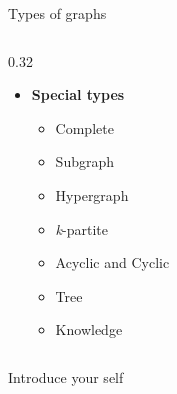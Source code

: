 \documentclass{beamer}
\begin{document}
\begin{frame}{Types of graphs}
\begin{columns}[t]
            \begin{column}{0.32\textwidth}
               \begin{itemize}
                    \item \textbf{Special types}
                    \begin{itemize}
                        \item Complete
                        \item Subgraph
                        \item Hypergraph
                        \item \textit{k}-partite
                        \item Acyclic and Cyclic
                        \item Tree
                        \item Knowledge            
                    \end{itemize}
                \end{itemize}
            \end{column}
        \end{columns}

        \begin{note}
            {Introduce your self}
        \end{note}
    \end{frame}
\end{document}
